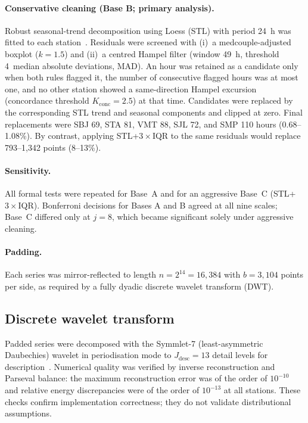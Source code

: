 \documentclass[12pt,letterpaper]{article}
\begin{document}
\paragraph{Conservative cleaning (Base B; primary analysis).}
Robust seasonal-trend decomposition using Loess (STL) with period 24~h was fitted to each station~\cite{cleveland1990}. Residuals were screened with (i)~a medcouple-adjusted boxplot ($k=1.5$) and (ii)~a centred Hampel filter (window 49~h, threshold 4~median absolute deviations, MAD). An hour was retained as a candidate only when both rules flagged it, the number of consecutive flagged hours was at most one, and no other station showed a same-direction Hampel excursion (concordance threshold $K_{\mathrm{conc}}=2.5$) at that time. Candidates were replaced by the corresponding STL trend and seasonal components and clipped at zero. Final replacements were SBJ 69, STA 81, VMT 88, SJL 72, and SMP 110 hours (0.68--1.08\%). By contrast, applying STL+$3\times$IQR to the same residuals would replace 793--1{,}342 points (8--13\%).

\paragraph{Sensitivity.}
All formal tests were repeated for Base~A and for an aggressive Base~C (STL+$3\times$IQR). Bonferroni decisions for Bases A and B agreed at all nine scales; Base~C differed only at $j=8$, which became significant solely under aggressive cleaning.

\paragraph{Padding.}
Each series was mirror-reflected to length $n=2^{14}=16{,}384$ with $b=3{,}104$ points per side, as required by a fully dyadic discrete wavelet transform (DWT).

\subsection{Discrete wavelet transform}
\label{subsec:dwt}

Padded series were decomposed with the Symmlet-7 (least-asymmetric Daubechies) wavelet in periodisation mode to $J_{\mathrm{desc}}=13$ detail levels for description~\cite{daubechies1992,mallat1989,nason2008}. Numerical quality was verified by inverse reconstruction and Parseval balance: the maximum reconstruction error was of the order of $10^{-10}$ and relative energy discrepancies were of the order of $10^{-13}$ at all stations. These checks confirm implementation correctness; they do not validate distributional assumptions.
\end{document}
